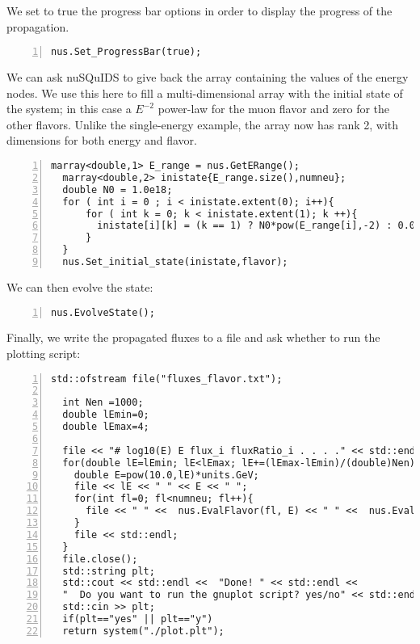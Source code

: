 \documentclass[3p,12pt]{elsarticle}
\newcommand{\ttf}{\ttfamily}
\begin{document}
We set to {\ttf true} the progress bar options in order to display the
progress of the propagation.

\begin{lstlisting}[frame=leftline, numbers = left,breaklines=true,label = ex:sin1,firstnumber=last]
  nus.Set_ProgressBar(true);
\end{lstlisting}

We can ask {\ttf nuSQuIDS} to give back the array containing the values of
the energy nodes. We use this here to fill a multi-dimensional array with the initial
state of the system; in this case a $E^{-2}$ power-law for the muon
flavor and zero for the other flavors.
Unlike the single-energy example, the array now has rank 2, with dimensions for both energy and flavor. 
 
\begin{lstlisting}[frame=leftline, numbers = left,breaklines=true,label = ex:sin1,firstnumber=last]
  marray<double,1> E_range = nus.GetERange();
  marray<double,2> inistate{E_range.size(),numneu};
  double N0 = 1.0e18;
  for ( int i = 0 ; i < inistate.extent(0); i++){
      for ( int k = 0; k < inistate.extent(1); k ++){
        inistate[i][k] = (k == 1) ? N0*pow(E_range[i],-2) : 0.0;
      }
  }
  nus.Set_initial_state(inistate,flavor);
\end{lstlisting}

We can then evolve the state:

\begin{lstlisting}[frame=leftline, numbers = left,breaklines=true,label = ex:sin1,firstnumber=last]
  nus.EvolveState();
\end{lstlisting}

Finally, we write the propagated fluxes to a file and ask whether to run the plotting script:

\begin{lstlisting}[frame=leftline, numbers = left,breaklines=true,label = ex:sin1,firstnumber=last]
  std::ofstream file("fluxes_flavor.txt");
  
  int Nen =1000;
  double lEmin=0;
  double lEmax=4;
  
  file << "# log10(E) E flux_i fluxRatio_i . . . ." << std::endl;
  for(double lE=lEmin; lE<lEmax; lE+=(lEmax-lEmin)/(double)Nen){
    double E=pow(10.0,lE)*units.GeV;
    file << lE << " " << E << " ";
    for(int fl=0; fl<numneu; fl++){
      file << " " <<  nus.EvalFlavor(fl, E) << " " <<  nus.EvalFlavor(fl, E)/(N0*pow(E,-2));
    }
    file << std::endl;
  }
  file.close();
  std::string plt;
  std::cout << std::endl <<  "Done! " << std::endl <<
  "  Do you want to run the gnuplot script? yes/no" << std::endl;
  std::cin >> plt;
  if(plt=="yes" || plt=="y")
  return system("./plot.plt");
\end{lstlisting}
\end{document}
